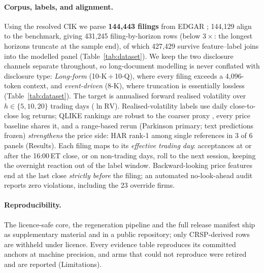 \paragraph{Corpus, labels, and alignment.}
Using the resolved CIK we parse \textbf{144{,}443 filings} from EDGAR \citep{sec2024edgar}; 144{,}129 align to the benchmark, giving 431{,}245 filing-by-horizon rows (below $3\times$: the longest horizons truncate at the sample end), of which 427{,}429 survive feature--label joins into the modelled panel (Table~\ref{tab:dataset}). We keep the two disclosure channels separate throughout, so long-document modelling is never conflated with disclosure type: \emph{Long-form} (10-K\,+\,10-Q), where every filing exceeds a 4{,}096-token context, and \emph{event-driven} (8-K), where truncation is essentially lossless (Table~\ref{tab:dataset}). The target is annualised forward realised volatility over $h\in\{5,10,20\}$ trading days ($\ln\mathrm{RV}$). Realised-volatility labels use daily close-to-close log returns; QLIKE rankings are robust to the coarser proxy \citep{patton2011proxies}, every price baseline shares it, and a range-based rerun (Parkinson primary; text predictions frozen) \emph{strengthens} the price side: HAR rank-1 among single references in 3 of 6 panels (Results). Each filing maps to its \emph{effective trading day}: acceptances at or after the 16:00\,ET close, or on non-trading days, roll to the next session, keeping the overnight reaction out of the label window. Backward-looking price features end at the last close \emph{strictly before} the filing; an automated no-look-ahead audit reports zero violations, including the 23 override firms.

\paragraph{Reproducibility.} The licence-safe core, the regeneration pipeline and the full release manifest ship as supplementary material and in a public repository; only CRSP-derived rows are withheld under licence. Every evidence table reproduces its committed anchors at machine precision, and arms that could not reproduce were retired and are reported (Limitations).

